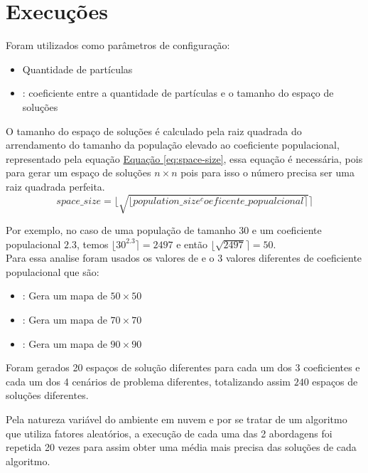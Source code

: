 \section{Execuções}
Foram utilizados como parâmetros de configuração:
\begin{itemize}
    \item {} Quantidade de partículas
    \item {}: coeficiente entre a quantidade de partículas e o tamanho do espaço de soluções
\end{itemize}
%
O tamanho do espaço de soluções é calculado pela raiz quadrada do arrendamento do tamanho da população elevado ao coeficiente populacional, representado pela equação 
\hyperref[eq:space-size]{Equação \ref{eq:space-size}}, 
essa equação é necessária, pois para gerar um espaço de soluções $n \times n$ pois para isso o número precisa ser uma raiz quadrada perfeita.
%
\begin{equation} 
    \label{eq:space-size}
    space\_size = \lfloor \sqrt{\lfloor population\_size^coeficente\_popualcional \rceil} \rceil
\end{equation}
%

Por exemplo, no caso de uma população de tamanho $30$ e um coeficiente populacional $2.3$, temos $\lfloor 30^{2.3} \rceil = 2497$ e então $\lfloor \sqrt{2497} \rceil = 50$.\\
Para essa analise foram usados os valores de  e o 3 valores diferentes de coeficiente populacional que são:
\begin{itemize}
    \item {}: Gera um mapa de $50 \times 50$
    \item {}: Gera um mapa de $70 \times 70$
    \item {}: Gera um mapa de $90 \times 90$
\end{itemize}

Foram gerados 20 espaços de solução diferentes para cada um dos 3 coeficientes e cada um dos 4 cenários de problema diferentes, totalizando assim $240$ espaços de soluções diferentes.

Pela natureza variável do ambiente em nuvem e por se tratar de um algoritmo que utiliza fatores aleatórios, a execução de cada uma das 2 abordagens foi repetida 20 vezes para assim obter uma média mais precisa das soluções de cada algoritmo.


